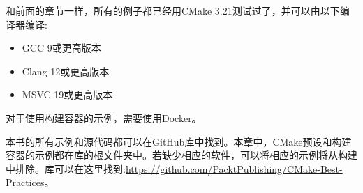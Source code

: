 和前面的章节一样，所有的例子都已经用CMake 3.21测试过了，并可以由以下编译器编译:

\begin{itemize}
\item 
GCC 9或更高版本

\item 
Clang 12或更高版本

\item 
MSVC 19或更高版本
\end{itemize}

对于使用构建容器的示例，需要使用Docker。

本书的所有示例和源代码都可以在GitHub库中找到。本章中，CMake预设和构建容器的示例都在库的根文件夹中。若缺少相应的软件，可以将相应的示例将从构建中排除。库可以在这里找到:\url{https://github.com/PacktPublishing/CMake-Best-Practices}。










